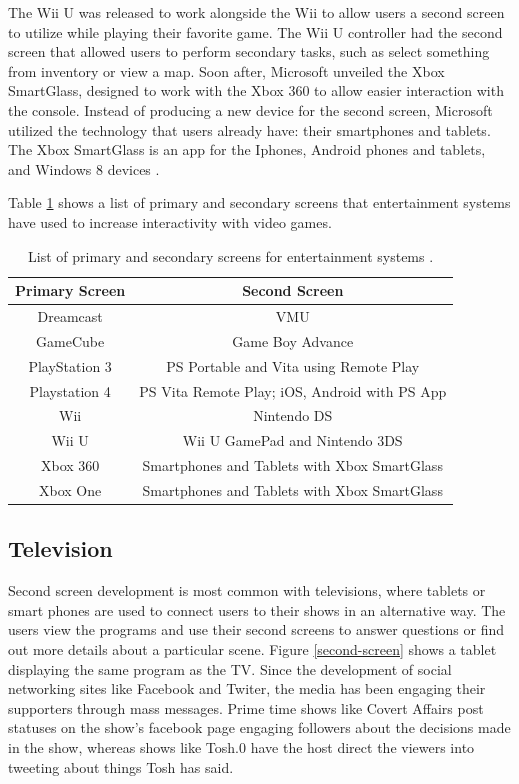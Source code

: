 \documentclass[11pt, oneside]{article}
\begin{document}
The Wii U was released to work alongside the Wii to allow users a second screen to utilize while playing their favorite game. The Wii U controller had the second screen that allowed users to perform secondary tasks, such as select something from inventory or view a map. Soon after, Microsoft unveiled the Xbox SmartGlass, designed to work with the Xbox 360 to allow easier interaction with the console. Instead of producing a new device for the second screen, Microsoft utilized the technology that users already have: their smartphones and tablets. The Xbox SmartGlass is an app for the Iphones, Android phones and tablets, and Windows 8 devices \cite{MashableSmartGlass}.

Table \ref{entertainment_table} shows a list of primary and secondary screens that entertainment systems have used to increase interactivity with video games. 

\begin{table}
    \centering
    \caption{List of primary and secondary screens for entertainment systems \cite{wiki_second_screen}.}
    \begin{tabular}{| c | c |}
        \hline
        Primary Screen & Second Screen \\ \hline
        Dreamcast & VMU \\ \hline
        GameCube & Game Boy Advance \\ \hline
        PlayStation 3 & PS Portable and Vita using Remote Play \\ \hline
        Playstation 4 & PS Vita Remote Play; iOS, Android with PS App \\ \hline
        Wii & Nintendo DS \\ \hline
        Wii U & Wii U GamePad and Nintendo 3DS \\ \hline
        Xbox 360 & Smartphones and Tablets with Xbox SmartGlass\\ \hline
        Xbox One & Smartphones and Tablets with Xbox SmartGlass \\ \hline
    \end{tabular}
    \label{entertainment_table}
\end{table}

\subsection{Television} 
Second screen development is most common with televisions, where tablets or smart phones are used to connect users to their shows in an alternative way. The users view the programs and use their second screens to answer questions or find out more details about a particular scene. Figure \ref{second-screen} shows a tablet displaying the same program as the TV. Since the development of social networking sites like Facebook and Twiter, the media has been engaging their supporters through mass messages. Prime time shows like Covert Affairs post statuses on the show's facebook page engaging followers about the decisions made in the show, whereas shows like Tosh.0 have the host direct the viewers into tweeting about things Tosh has said. 
\end{document}
